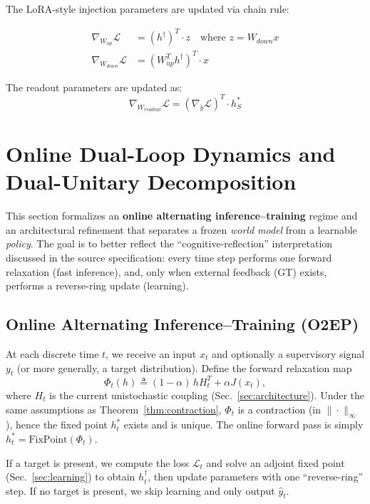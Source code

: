 \documentclass[11pt,a4paper]{article}
\newcommand{\LL}{\mathcal{L}}
\begin{document}
The LoRA-style injection parameters are updated via chain rule:

\begin{align}
\nabla_{W_{up}}\LL &= (h^\dagger)^T \cdot z \quad \text{where } z = W_{down}x \\
\nabla_{W_{down}}\LL &= (W_{up}^T h^\dagger)^T \cdot x
\end{align}

The readout parameters are updated as:
\begin{equation}
\nabla_{W_{readout}}\LL = (\nabla_{\hat{y}}\LL)^T \cdot h^*_S
\end{equation}

\section{Online Dual-Loop Dynamics and Dual-Unitary Decomposition}
\label{sec:o2ep}

This section formalizes an \textbf{online alternating inference--training} regime and an architectural refinement that separates a frozen \emph{world model} from a learnable \emph{policy}. The goal is to better reflect the ``cognitive-reflection'' interpretation discussed in the source specification: every time step performs one forward relaxation (fast inference), and, only when external feedback (GT) exists, performs a reverse-ring update (learning).

\subsection{Online Alternating Inference--Training (O2EP)}

At each discrete time $t$, we receive an input $x_t$ and optionally a supervisory signal $y_t$ (or more generally, a target distribution). Define the forward relaxation map
\begin{equation}
\Phi_t(h) \triangleq (1-\alpha)\,hH_t^T + \alpha J(x_t),
\end{equation}
where $H_t$ is the current unistochastic coupling (Sec.~\ref{sec:architecture}). Under the same assumptions as Theorem~\ref{thm:contraction}, $\Phi_t$ is a contraction (in $\|\cdot\|_\infty$), hence the fixed point $h_t^*$ exists and is unique. The online forward pass is simply $h_t^*=\text{FixPoint}(\Phi_t)$.

If a target is present, we compute the loss $\LL_t$ and solve an adjoint fixed point (Sec.~\ref{sec:learning}) to obtain $h_t^\dagger$, then update parameters with one ``reverse-ring'' step. If no target is present, we skip learning and only output $\hat{y}_t$.
\end{document}
